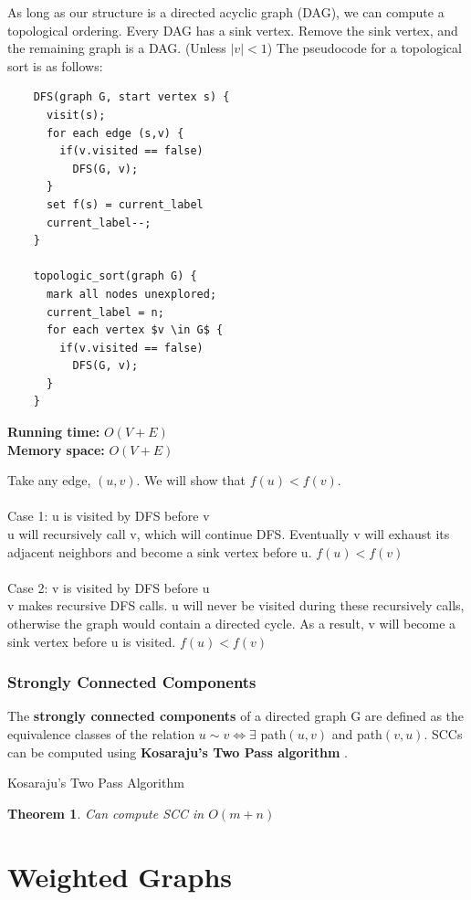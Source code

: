 \documentclass[]{book}
\makeatletter
\renewenvironment{proof}[1][\proofname] {\par\pushQED{\qed}\normalfont\topsep6\p@\@plus6\p@\relax\trivlist\item[\hskip\labelsep\bfseries#1\@addpunct{.}]\ignorespaces}{\popQED\endtrivlist\@endpefalse}
\newcommand{\runtime}[1]{\textbf{Running time:} $O(#1)$\\}
\newcommand{\memory}[1]{\textbf{Memory space:} $O(#1)$\\}
\makeatother
\begin{document}
  As long as our structure is a directed acyclic graph (DAG), we can compute a topological ordering.
  Every DAG has a sink vertex. Remove the sink vertex, and the remaining graph is a DAG. (Unless
  $|v| < 1$) The pseudocode for a topological sort is as follows:
  \begin{Verbatim}
    DFS(graph G, start vertex s) {
      visit(s);
      for each edge (s,v) {
        if(v.visited == false)
          DFS(G, v);
      }
      set f(s) = current_label
      current_label--;
    }

    topologic_sort(graph G) {
      mark all nodes unexplored;
      current_label = n;
      for each vertex $v \in G$ {
        if(v.visited == false)
          DFS(G, v);
      }
    }
  \end{Verbatim}
  \runtime{V + E}
  \memory{V + E}
  \begin{proof}
    Take any edge, $(u,v)$. We will show that $f(u) < f(v)$.\\\\
    \indent Case 1: u is visited by DFS before v\\
    u will recursively call v, which will continue DFS. Eventually v will exhaust
    its adjacent neighbors and become a sink vertex before u. $f(u) < f(v)$\\\\
    \indent Case 2: v is visited by DFS before u\\
    v makes recursive DFS calls. u will never be visited during these recursively calls,
    otherwise the graph would contain a directed cycle. As a result, v will become a sink
    vertex before u is visited. $f(u) < f(v)$
  \end{proof}

  \subsection{Strongly Connected Components}
  The \textbf{strongly connected components} of a directed graph G are defined
  as the equivalence classes of the relation $u\sim v \Leftrightarrow \exists$ path$(u,v)$ and
  path$(v,u)$. SCCs can be computed using \textbf{Kosaraju's Two Pass algorithm}
  .

  Kosaraju's Two Pass Algorithm
  \newtheorem{Kosaraju}{Theorem}[section]
  \begin{Kosaraju}
    Can compute SCC in $O(m+n)$
  \end{Kosaraju}
  \chapter{Weighted Graphs}
\end{document}
